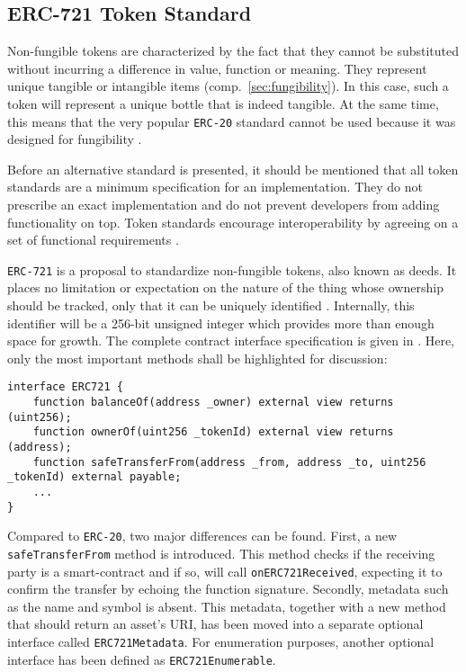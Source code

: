 \subsection{ERC-721 Token Standard}
Non-fungible tokens are characterized by the fact that they cannot be substituted without incurring a difference in value, function or meaning. They represent unique tangible or intangible items (comp.~\ref{sec:fungibility}). In this case, such a token will represent a unique bottle that is indeed tangible. At the same time, this means that the very popular \texttt{\acs{ERC}-20} standard cannot be used because it was designed for fungibility \cite{erc20}. 

Before an alternative standard is presented, it should be mentioned that all token standards are a minimum specification for an implementation. They do not prescribe an exact implementation and do not prevent developers from adding functionality on top. Token standards encourage interoperability by agreeing on a set of functional requirements \cite[pp.~198--199]{Antonopoulos.2018}. 

\texttt{\acs{ERC}-721} is a proposal to standardize non-fungible tokens, also known as deeds. It places no limitation or expectation on the nature of the thing whose ownership should be tracked, only that it can be uniquely identified \cite[p.~197]{Antonopoulos.2018}. Internally, this identifier will be a 256-bit unsigned integer which provides more than enough space for growth. The complete contract interface specification is given in \cite{erc721}. Here, only the most important methods shall be highlighted for discussion:

\begin{lstlisting}[language=Solidity, caption=ERC-721 contract interface specification, label=lst:erc721]
interface ERC721 {
    function balanceOf(address _owner) external view returns (uint256);
    function ownerOf(uint256 _tokenId) external view returns (address);
    function safeTransferFrom(address _from, address _to, uint256 _tokenId) external payable;
    ...
}
\end{lstlisting}
 
Compared to \texttt{\acs{ERC}-20}, two major differences can be found. First, a new \texttt{safeTransferFrom} method is introduced. This method checks if the receiving party is a smart-contract and if so, will call \texttt{onERC721Received}, expecting it to confirm the transfer by echoing the function signature. Secondly, metadata such as the name and symbol is absent. This metadata, together with a new method that should return an asset's URI, has been moved into a separate optional interface called \texttt{ERC721Metadata}. For enumeration purposes, another optional interface has been defined as  \texttt{ERC721Enumerable}.

